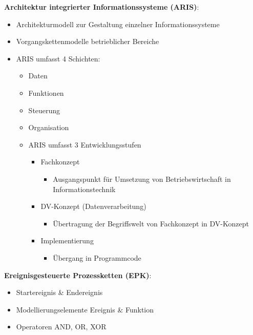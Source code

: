 \documentclass[a4]{scrartcl}
\begin{document}
\textbf{Architektur integrierter Informationssysteme (ARIS)}:
\begin{itemize}
    \item Architekturmodell zur Gestaltung einzelner Informationssysteme
    \item Vorgangskettenmodelle betrieblicher Bereiche
    \item ARIS umfasst 4 Schichten: 
    \begin{itemize}
        \item Daten 
        \item Funktionen
        \item Steuerung
        \item Organisation
        \item ARIS umfasst 3 Entwicklungsstufen
        \begin{itemize}
            \item Fachkonzept
            \begin{itemize}
                \item Ausgangspunkt für Umsetzung von Betriebswirtschaft in Informationstechnik
            \end{itemize}
            \item DV-Konzept (Datenverarbeitung)
            \begin{itemize}
                \item Übertragung der Begriffswelt von Fachkonzept in DV-Konzept
            \end{itemize}
            \item Implementierung
            \begin{itemize}
                \item Übergang in Programmcode
            \end{itemize}
        \end{itemize}
    \end{itemize}
\end{itemize}

\newpage
\textbf{Ereignisgesteuerte Prozessketten (EPK)}:
\begin{itemize}
    \item Startereignis \& Endereignis
    \item Modellierungselemente Ereignis \& Funktion
    \item Operatoren AND, OR, XOR
\end{itemize}
\end{document}
